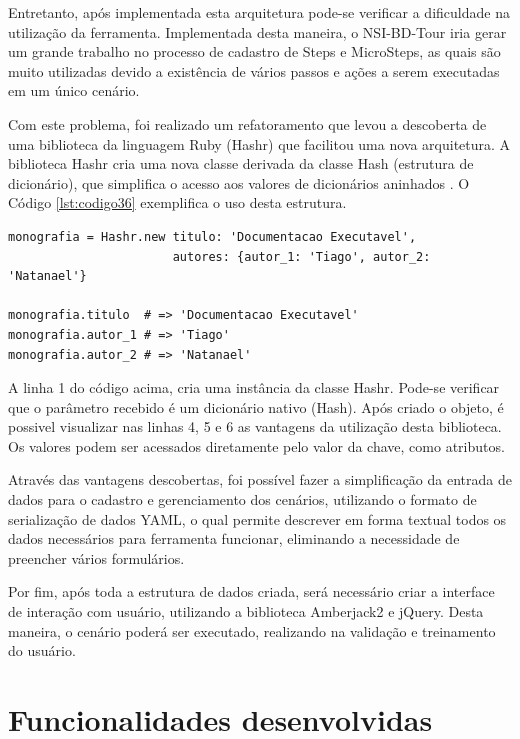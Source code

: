 Entretanto, após implementada esta arquitetura pode-se verificar a dificuldade na utilização da ferramenta. Implementada desta maneira, o NSI-BD-Tour iria gerar um grande trabalho no processo de cadastro de Steps e MicroSteps, as quais são muito utilizadas devido a existência de vários passos e ações a serem executadas em um único cenário.

Com este problema, foi realizado um refatoramento que levou a descoberta de uma biblioteca da linguagem Ruby (Hashr) que facilitou uma nova arquitetura. A biblioteca Hashr cria uma nova classe derivada da classe Hash (estrutura de dicionário), que simplifica o acesso aos valores de dicionários aninhados \cite{HASHR}. O Código \ref{lst:codigo36} exemplifica o uso desta estrutura.

{\singlespace
\begin{lstlisting}[caption=Exemplo de uso da estrutura \textit{Hashr},label={lst:codigo36}]
monografia = Hashr.new titulo: 'Documentacao Executavel',
                       autores: {autor_1: 'Tiago', autor_2: 'Natanael'}

monografia.titulo  # => 'Documentacao Executavel'
monografia.autor_1 # => 'Tiago'
monografia.autor_2 # => 'Natanael'

\end{lstlisting}
}

A linha 1 do código acima, cria uma instância da classe Hashr. Pode-se verificar que o parâmetro recebido é um dicionário nativo (Hash). Após criado o objeto, é possivel visualizar nas linhas 4, 5 e 6 as vantagens da utilização desta biblioteca. Os valores podem ser acessados diretamente pelo valor da chave, como atributos.

Através das vantagens descobertas, foi possível fazer a simplificação da entrada de dados para o cadastro e gerenciamento dos cenários, utilizando o formato de serialização de dados YAML, o qual permite descrever em forma textual todos os dados necessários para ferramenta funcionar, eliminando a necessidade de preencher vários formulários.

Por fim, após toda a estrutura de dados criada, será necessário criar a interface de interação com usuário, utilizando a biblioteca Amberjack2 e jQuery. Desta maneira, o cenário poderá ser executado, realizando na validação e treinamento do usuário.

\section{Funcionalidades desenvolvidas}

